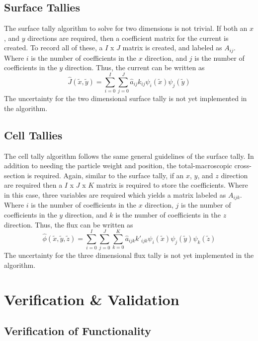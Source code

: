 \documentclass[10tma4paper]{article}
\begin{document}
\subsection{Surface Tallies}\label{Surface}
The surface tally algorithm to solve for two dimensions is not trivial. If both an $x$, and $y$ directions are required, then a coefficient matrix for the current is created. To record all of these, a $I$ x $J$ matrix is created, and labeled as $A_{ij}$. Where $i$ is the number of coefficients in the 
$x$ direction, and $j$ is the number of coefficients in the $y$ direction. Thus, the current can be written as 
\begin{equation}\label{eq:surface current}
\hat{J}(\tilde{x},\tilde{y}) =  \sum_{i=0}^{I}\sum_{j=0}^{J}\hat{a}_{ij}k_{ij}\psi_{i}(\tilde{x})\psi_{j}(\tilde{y})
\end{equation}
The uncertainty for the two dimensional surface tally is not yet implemented in the algorithm.

\subsection{Cell Tallies}\label{Collision}

The cell tally algorithm follows the same general guidelines of the surface tally. In addition to needing the particle weight and position, the total-macroscopic cross-section is required. Again, similar to the surface tally, if an $x$, $y$, and $z$ direction are required then a $I$ x $J$ x $K$ matrix is required to store the coefficients. Where in this case, three variables are required which yields a matrix labeled as $A_{ijk}$. Where $i$ is the number of coefficients in the $x$ direction, $j$ is the number of coefficients in the $y$ direction, and $k$ is the number of coefficients in the $z$ direction. Thus, the flux can be written as
\begin{equation}\label{eq:flux tally}
\hat{\phi}(\tilde{x},\tilde{y},\tilde{z}) =  \sum_{i=0}^{I}\sum_{j=0}^{J}\sum_{k=0}^{K}\hat{a}_{ijk}k'_{ijk}\psi_{i}(\tilde{x})\psi_{j}(\tilde{y})\psi_{k}(\tilde{z})
\end{equation}
The uncertainty for the three dimensional flux tally is not yet implemented in the algorithm.

\section{Verification \& Validation}\label{vv}
\subsection{Verification of Functionality}\label{P1}
\end{document}
